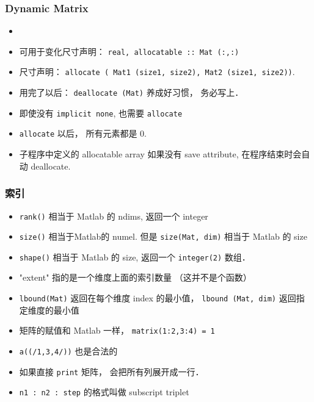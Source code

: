 \subsubsection{Dynamic Matrix}
\begin{itemize}
\item \item 可用于变化尺寸声明： \verb`real, allocatable :: Mat (:,:)`
\item 尺寸声明： \verb`allocate ( Mat1 (size1, size2), Mat2 (size1, size2))`.
\item 用完了以后： \verb`deallocate (Mat)` 养成好习惯， 务必写上．
\item 即使没有 \verb`implicit none`, 也需要 \verb`allocate`
\item \verb|allocate| 以后， 所有元素都是 0.
\item 子程序中定义的 allocatable array 如果没有 save attribute, 在程序结束时会自动 deallocate.
\end{itemize}

\subsubsection{索引}
\begin{itemize}
\item \verb`rank()` 相当于 Matlab 的 ndims, 返回一个 integer
\item \verb`size()` 相当于Matlab的 numel. 但是 \verb`size(Mat, dim)` 相当于 Matlab 的 size
\item \verb`shape()` 相当于 Matlab 的 size, 返回一个 \verb`integer(2)` 数组．
\item "extent" 指的是一个维度上面的索引数量 （这并不是个函数）
\item \verb`lbound(Mat)` 返回在每个维度 index 的最小值， \verb`lbound (Mat, dim)` 返回指定维度的最小值
\item 矩阵的赋值和 Matlab 一样， \verb`matrix(1:2,3:4) = 1`
\item \verb`a((/1,3,4/))` 也是合法的
\item 如果直接 \verb`print` 矩阵， 会把所有列展开成一行．
\item \verb`n1 : n2 : step` 的格式叫做 subscript triplet
\end{itemize}

